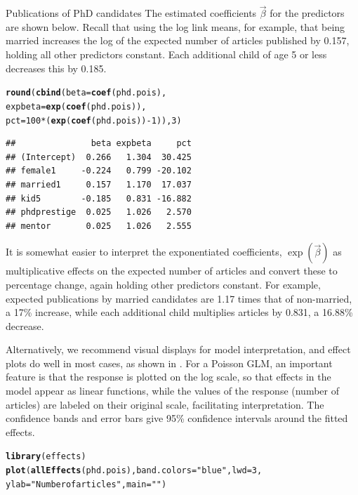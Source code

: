 \documentclass[11pt]{book}\usepackage[]{graphicx}\usepackage[]{color}
\makeatletter
\newcommand{\hlnum}[1]{\textcolor[rgb]{0.686,0.059,0.569}{#1}}%
\newcommand{\hlstr}[1]{\textcolor[rgb]{0.192,0.494,0.8}{#1}}%
\newcommand{\hlopt}[1]{\textcolor[rgb]{0,0,0}{#1}}%
\newcommand{\hlstd}[1]{\textcolor[rgb]{0.345,0.345,0.345}{#1}}%
\newcommand{\hlkwc}[1]{\textcolor[rgb]{0.333,0.667,0.333}{#1}}%
\newcommand{\hlkwd}[1]{\textcolor[rgb]{0.737,0.353,0.396}{\textbf{#1}}}%
\newenvironment{kframe}{%
 \def\at@end@of@kframe{}%
 \ifinner\ifhmode%
  \def\at@end@of@kframe{\end{minipage}}%
  \begin{minipage}{\columnwidth}%
 \fi\fi%
 \def\FrameCommand##1{\hskip\@totalleftmargin \hskip-\fboxsep
 \colorbox{shadecolor}{##1}\hskip-\fboxsep
     \hskip-\linewidth \hskip-\@totalleftmargin \hskip\columnwidth}%
 \MakeFramed {\advance\hsize-\width
   \@totalleftmargin\z@ \linewidth\hsize
   \@setminipage}}%
 {\par\unskip\endMakeFramed%
 \at@end@of@kframe}
\newenvironment{knitrout}{}{} %
\renewenvironment{knitrout}{\small\renewcommand{\baselinestretch}{.85}}{} %
\makeatother
\begin{document}
\begin{Example}[phdpubs1]{Publications of PhD candidates}
The estimated coefficients $\vec{\beta}$ for the predictors are shown below.
Recall that using the log link means, for example, that being married increases
the log of the expected number of
articles published by 0.157, holding all other predictors constant.
Each additional child of age 5 or less decreases this by 0.185.
\begin{knitrout}
\color{fgcolor}\begin{kframe}
\begin{alltt}
\hlkwd{round}\hlstd{(}\hlkwd{cbind}\hlstd{(}\hlkwc{beta}\hlstd{=}\hlkwd{coef}\hlstd{(phd.pois),}
            \hlkwc{expbeta}\hlstd{=}\hlkwd{exp}\hlstd{(}\hlkwd{coef}\hlstd{(phd.pois)),}
            \hlkwc{pct}\hlstd{=}\hlnum{100}\hlopt{*}\hlstd{(}\hlkwd{exp}\hlstd{(}\hlkwd{coef}\hlstd{(phd.pois))}\hlopt{-}\hlnum{1}\hlstd{)),}\hlnum{3}\hlstd{)}
\end{alltt}
\begin{verbatim}
##               beta expbeta     pct
## (Intercept)  0.266   1.304  30.425
## female1     -0.224   0.799 -20.102
## married1     0.157   1.170  17.037
## kid5        -0.185   0.831 -16.882
## phdprestige  0.025   1.026   2.570
## mentor       0.025   1.026   2.555
\end{verbatim}
\end{kframe}
\end{knitrout}
\noindent It is somewhat easier to interpret the exponentiated coefficients, $\exp(\vec{\beta})$
as multiplicative effects on the expected number of articles and convert these to percentage
change, again holding other predictors constant.
For example, expected publications by married candidates are 1.17 times that of non-married,
a 17\% increase, while each additional child multiplies articles by 0.831, a 16.88\% decrease.

Alternatively, we recommend visual displays for model interpretation, and effect plots do well
in most cases, as shown in  .
For a Poisson GLM, an important feature is that the response is plotted on
the log scale, so that effects in the model appear as linear functions, while the
values of the response (number of articles) are labeled on their original scale, facilitating
interpretation. The confidence bands and error bars give 95\% confidence intervals
around the fitted effects.

\begin{knitrout}
\color{fgcolor}\begin{kframe}
\begin{alltt}
\hlkwd{library}\hlstd{(effects)}
\hlkwd{plot}\hlstd{(}\hlkwd{allEffects}\hlstd{(phd.pois),} \hlkwc{band.colors}\hlstd{=}\hlstr{"blue"}\hlstd{,} \hlkwc{lwd}\hlstd{=}\hlnum{3}\hlstd{,}
     \hlkwc{ylab}\hlstd{=}\hlstr{"Number of articles"}\hlstd{,} \hlkwc{main}\hlstd{=}\hlstr{""}\hlstd{)}
\end{alltt}
\end{kframe}\begin{figure}[!htbp]


\end{figure}
\end{knitrout}
\end{Example}
\end{document}
